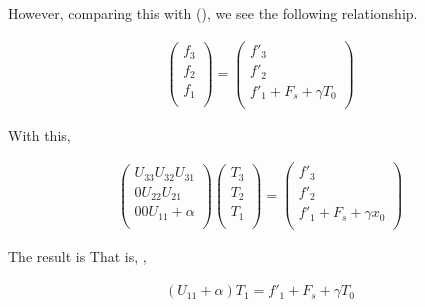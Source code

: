 However, comparing this with
(\protect\hyperlink{solve-z}{\ltra[solve-z]}), we see the following
relationship.

\begin{eqnarray}
  \left( \begin{array}{l}
         f_3 \\ f_2 \\ f_1 \\
         \end{array} \right)
 = 
  \left( \begin{array}{l}
         f'_3 \\ f'_2 \\ f'_1 + F_s + \gamma T_0 \\
         \end{array} \right)
\end{eqnarray}

With this,

\begin{eqnarray}
  \left( \begin{array}{lll}
         U_{33}  U_{32}  U_{31} \\
         0       U_{22}  U_{21} \\
         0       0       U_{11} + \alpha \\
         \end{array} \right)
  \left( \begin{array}{l}
         T_3 \\ T_2 \\ T_1 \\
         \end{array} \right)
  = 
  \left(  \begin{array}{l}
          f'_3 \\ f'_2 \\ f'_1 + F_s + \gamma x_0 \\
          \end{array} \right)
\end{eqnarray}

\begin{quote}
\protect\hypertarget{solve-x}{}{\blazer[solve-x]}
\end{quote}

The result is That is, ,

\begin{eqnarray}
  ( U_{11} +  \alpha  ) T_1 = f'_1 + F_s + \gamma T_0 
\end{eqnarray}

\begin{quote}
\protect\hypertarget{solve-1}{}{}
\end{quote}

